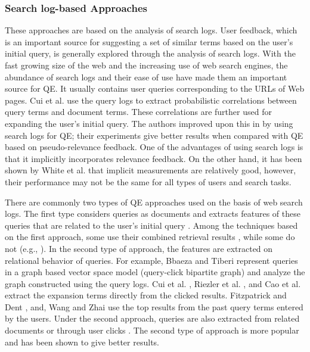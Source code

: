\subsubsection{Search log-based Approaches}
These approaches are based on the analysis of search logs. User feedback, which is an important source for suggesting a set of similar terms based on the user's initial query, is generally explored through the analysis of search logs. With the fast growing size of the web and the increasing use  of web search engines, the abundance of search logs and their ease of use  have made them an important source for QE. It usually contains user queries corresponding to the URLs of Web pages. Cui et al. \cite{cui2002probabilistic} use the query logs to extract probabilistic correlations between query terms and document terms. These correlations are further used for expanding the user's initial query. The authors improved upon this in \cite{cui2003query} by using search logs for QE; their experiments give better results when compared with QE based on pseudo-relevance feedback. One of the advantages of using search logs is that it implicitly incorporates relevance feedback. On the other hand, it has been shown by White et al. \cite{white2005study} that implicit measurements are relatively good, however,  their performance may not be the same for all types of users and search tasks.

There are commonly two types of QE approaches used on the basis of web search logs. The first type considers queries as documents and extracts features of these queries that are related to the user's initial query \cite{huang2003relevant}. Among the techniques based on the first approach, some use their combined retrieval results \cite{huang2009analyzing}, while some do not (e.g., \cite{huang2003relevant,yin2009query}).  In the second type of approach, the features are extracted on relational behavior of queries. For example, Bbaeza and Tiberi \cite{baeza2007extracting} represent queries in a graph based vector space model (query-click bipartite graph) and analyze the graph constructed using the query logs. Cui et al. \cite{cui2003query}, Riezler et al. \cite{riezler2007statistical}, and Cao et al. \cite{cao2008context} extract the expansion terms directly from the clicked results. Fitzpatrick and Dent \cite{fitzpatrick1997automatic}, and, Wang and Zhai \cite{wang2007learn} use the top results from the past query terms entered by the users. Under the second approach, queries are also extracted  from related documents \cite{billerbeck2003query,wang2008mining} or through user clicks \cite{xue2004optimizing,yin2009query,hua2013clickage}. The second type of approach is more popular and has been shown to give better results. 

